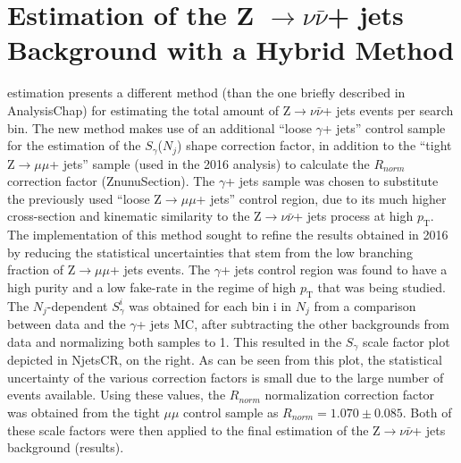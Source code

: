 \section{Estimation of the Z $\rightarrow \nu\bar{\nu}$+ jets Background with a Hybrid Method}

{estimation} presents a different method (than the one briefly described in {AnalysisChap}) for estimating the total amount of Z$\rightarrow \nu\bar{\nu}$+ jets events per search bin. The new method makes use of an additional ``loose $\gamma$+ jets'' control sample for the estimation of the $S_\gamma$($N_j$) shape correction factor, in addition to the ``tight Z$\rightarrow\mu\mu$+ jets'' sample (used in the 2016 analysis) to calculate the $R_{norm}$ correction factor ({ZnunuSection}). The $\gamma$+ jets sample was chosen to substitute the previously used ``loose Z$\rightarrow\mu\mu$+ jets'' control region, due to its much higher cross-section and kinematic similarity to the Z$\rightarrow \nu\bar{\nu}$+ jets process at high $p_\text{T}$. The implementation of this method sought to refine the results obtained in 2016 by reducing the statistical uncertainties that stem from the low branching fraction of Z$\rightarrow\mu\mu$+ jets events. The $\gamma$+ jets control region was found to have a high purity and a low fake-rate in the regime of high $p_\text{T}$ that was being studied. The $N_j$-dependent $S_\gamma^{i}$ was obtained for each bin i in $N_j$ from a comparison between data and the $\gamma$+ jets MC, after subtracting the other backgrounds from data and normalizing both samples to 1. This resulted in the $S_\gamma$ scale factor plot depicted in {NjetsCR}, on the right. As can be seen from this plot, the statistical uncertainty of the various correction factors is small due to the large number of events available. Using these values, the $R_{norm}$ normalization correction factor was obtained from the tight $\mu\mu$ control sample as $R_{norm} = 1.070 \pm 0.085$. Both of these scale factors were then applied to the final estimation of the Z$\rightarrow \nu\bar{\nu}$+ jets background ({results}).
